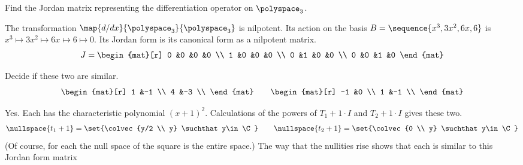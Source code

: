 \begin{exercises}
\begin{answer}
     \end{answer}
  \recommended \item 
    Find the Jordan matrix representing the differentiation
    operator on \( \polyspace_3 \).
    \begin{answer}
      The transformation $\map{d/dx}{\polyspace_3}{\polyspace_3}$ 
      is nilpotent.
      Its action on the basis \( B=\sequence{x^3,3x^2,6x,6} \)
      is $x^3\mapsto 3x^2\mapsto 6x\mapsto 6\mapsto 0$.
      Its Jordan form is its canonical form as a nilpotent matrix.
      \begin{equation*}
         J=
         \begin{mat}[r]
           0  &0  &0  &0  \\
           1  &0  &0  &0  \\
           0  &1  &0  &0  \\
           0  &0  &1  &0
         \end{mat}
      \end{equation*}
    \end{answer}
   \recommended \item 
      Decide if these two are similar.
      \begin{equation*}
         \begin{mat}[r]
            1  &-1 \\
            4  &-3 \\
         \end{mat}
         \qquad
         \begin{mat}[r]
           -1  &0  \\
            1  &-1 \\
         \end{mat}
      \end{equation*}
      \begin{answer}
        Yes.
        Each has the characteristic polynomial $(x+1)^2$.
        Calculations of the powers of $T_1+1\cdot I$ and 
        $T_2+1\cdot I$ gives these two.
        \begin{equation*}
          \nullspace{t_1+1}=\set{\colvec{y/2 \\ y} \suchthat y\in\C}
          \qquad
          \nullspace{t_2+1}=\set{\colvec{0 \\ y} \suchthat y\in\C}
        \end{equation*}
        (Of course, for each the null space of the square is 
        the entire space.)
        The way that the nullities rise shows that each is  
        similar to this Jordan form matrix

\end{answer}
\end{exercises}
